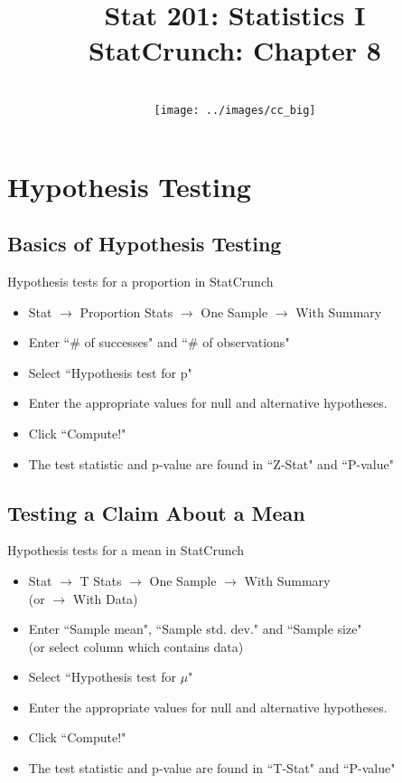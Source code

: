 \documentclass[xcolor=table]{beamer}
\title[Chapter 8]{Stat 201: Statistics I\\ StatCrunch: Chapter 8 }
\author[M. Shyne]{}
\institute[Metro State]{\texttt{[image: ../images/metro\_logo]}}
\date[7/14/2019]{
\\ \bigskip \bigskip \texttt{[image: ../images/cc\_big]}}
\begin{document}
\frame{\titlepage}

\setcounter{section}{7}
\section{Hypothesis Testing}

\subsection{Basics of Hypothesis Testing}


\begin{frame}{Hypothesis tests for a proportion in StatCrunch}

\begin{block}{}
\large
\begin{itemize}
\item Stat $\to$ Proportion Stats $\to$ One Sample $\to$ With Summary
\item Enter ``\# of successes" and ``\# of observations"
\item Select ``Hypothesis test for p"
\item Enter the appropriate values for null and alternative hypotheses.
\item Click ``Compute!"
\item The test statistic and p-value are found in ``Z-Stat" and ``P-value"
\end{itemize}
\end{block}

\end{frame}


\subsection{Testing a Claim About a Mean}


\begin{frame}{Hypothesis tests for a mean in StatCrunch}

\begin{block}{}
\large
\begin{itemize}
\item Stat $\to$ T Stats $\to$ One Sample $\to$ With Summary\\ (or $\to$ With Data)
\item Enter ``Sample mean", ``Sample std. dev." and ``Sample size"\\
(or select column which contains data)
\item Select ``Hypothesis test for $\mu$"
\item Enter the appropriate values for null and alternative hypotheses.
\item Click ``Compute!"
\item The test statistic and p-value are found in ``T-Stat" and ``P-value"
\end{itemize}
\end{block}

\end{frame}
\end{document}
